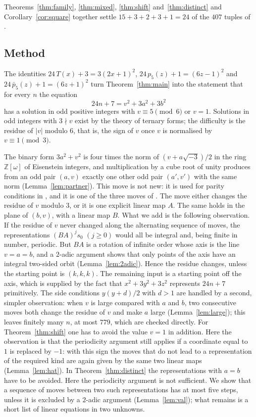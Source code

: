 \documentclass[11pt]{amsart}
\theoremstyle{definition}
\theoremstyle{remark}
\newcommand{\Z}{\mathbb{Z}}
\newcommand{\pb}{\bar p_5}
\newcommand{\Tr}{T}
\begin{document}
Theorems~\ref{thm:family}, \ref{thm:mixed}, \ref{thm:shift} and~\ref{thm:distinct} and Corollary~\ref{cor:square} together settle
$15+3+2+3+1=24$ of the $407$ tuples of \cite[Conjecture~1.5]{S20}.

\subsection*{Method}
The identities $24\,\Tr(x)+3=3(2x+1)^2$, $24\,p_5(z)+1=(6z-1)^2$ and $24\,\pb(z)+1=(6z+1)^2$
turn Theorem~\ref{thm:main} into the statement that for every $n$ the equation
\begin{equation}\label{eq:intro}
24n+7=v^2+3a^2+3b^2
\end{equation}
has a solution in odd positive integers with $v\equiv 5\pmod 6$ or $v=1$.
Solutions in odd integers with $3\nmid v$ exist by the theory of ternary forms;
the difficulty is the residue of $|v|$ modulo $6$, that is, the sign of $v$ once $v$ is normalised by $v\equiv 1\pmod 3$.

The binary form $3a^2+v^2$ is four times the norm of $(v+a\sqrt{-3})/2$ in the ring $\Z[\omega]$
of Eisenstein integers, and multiplication by a cube root of unity produces from an odd pair $(a,v)$ exactly one
other odd pair $(a',v')$ with the same norm (Lemma~\ref{lem:partner}).
This move is not new: it is used for parity conditions in \cite[Lemma~3.2 and Theorem~1.7(iii)]{S15},
and it is one of the three moves of \cite[Lemmas~8 and~9]{CGQFG}.
The move either changes the residue of $v$ modulo $3$, or it is one explicit linear map $A$.
The same holds in the plane of $(b,v)$, with a linear map $B$.
What we add is the following observation.
If the residue of $v$ never changed along the alternating sequence of moves, the representations
$(BA)^j s_0$ $(j\ge 0)$ would all be integral and, being finite in number, periodic.
But $BA$ is a rotation of infinite order whose axis is the line $v=a=b$, and a $2$-adic argument
shows that only points of the axis have an integral two-sided orbit (Lemma~\ref{lem:2adic}).
Hence the residue changes, unless the starting point is $(k,k,k)$.
The remaining input is a starting point off the axis, which is supplied by the fact that
$x^2+3y^2+3z^2$ represents $24n+7$ primitively.
The side conditions $y(y+d)/2$ with $d>1$ are handled by a second, simpler observation:
when $v$ is large compared with $a$ and $b$, two consecutive moves both change the residue of $v$
and make $a$ large (Lemma~\ref{lem:large}); this leaves finitely many $n$, at most $779$, which are checked directly.
For Theorem~\ref{thm:shift} one has to avoid the value $v=1$ in addition.
Here the observation is that the periodicity argument still applies if a coordinate equal to $1$ is replaced by $-1$:
with this sign the moves that do not lead to a representation of the required kind are again given by the same two linear maps
(Lemma~\ref{lem:hat}).
In Theorem~\ref{thm:distinct} the representations with $a=b$ have to be avoided. Here the periodicity argument is not sufficient.
We show that a sequence of moves between two such representations has at most five steps,
unless it is excluded by a $2$-adic argument (Lemma~\ref{lem:val}); what remains is a short list of linear equations in two unknowns.
\end{document}
